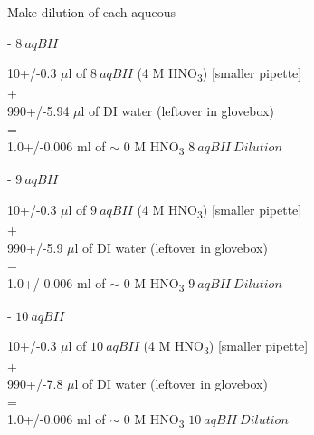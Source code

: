 \documentclass[idxtotoc,hyperref,openany,oneside]{labbook} %
\newcommand{\cmark}{\ding{51}}%
\newcommand{\done}{\rlap{$\square$}{\raisebox{2pt}{\large\hspace{1pt}\cmark}}%
  \hspace{-2.5pt}}
\newcommand{\tsbs}{\textsubscript}
\begin{document}
\begin{todolist}
\item[\done]{Make dilution of each aqueous}
  \begin{todolist}
  \item[\done]{- $\boxed{8\ aqBII}$}
  \end{todolist}
  \begin{center}
    10+/-0.3 $\mu$l of $\boxed{8\ aqBII}$
    (4 M HNO\tsbs{3}) [smaller pipette]\\
    +\\
    990+/-5.94 $\mu$l of DI water (leftover in glovebox)\\
    =\\
    1.0+/-0.006 ml of $\sim$
    0 M HNO\tsbs{3} $\boxed{8\ aqBII\ Dilution}$
  \end{center}
  \begin{todolist}
  \item[\done]{- $\boxed{9\ aqBII}$}
  \end{todolist}
  \begin{center}
    10+/-0.3 $\mu$l of $\boxed{9\ aqBII}$
    (4 M HNO\tsbs{3}) [smaller pipette]\\
    +\\
    990+/-5.9 $\mu$l of DI water (leftover in glovebox)\\
    =\\
    1.0+/-0.006 ml of $\sim$
    0 M HNO\tsbs{3} $\boxed{9\ aqBII\ Dilution}$
  \end{center}
  \begin{todolist}
  \item[\done]{- $\boxed{10\ aqBII}$}
  \end{todolist}
  \begin{center}
    10+/-0.3 $\mu$l of $\boxed{10\ aqBII}$
    (4 M HNO\tsbs{3}) [smaller pipette]\\
    +\\
    990+/-7.8 $\mu$l of DI water (leftover in glovebox)\\
    =\\
    1.0+/-0.006 ml of $\sim$
    0 M HNO\tsbs{3} $\boxed{10\ aqBII\ Dilution}$
  \end{center}


\end{todolist}
\end{document}
